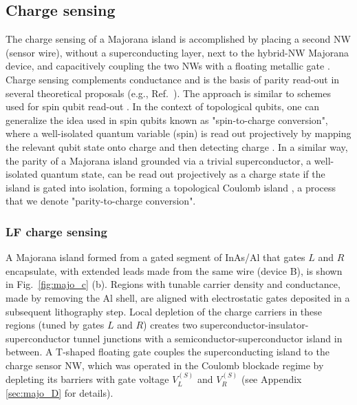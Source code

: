 \subsection{Charge sensing}
The charge sensing of a Majorana island is accomplished by placing a second NW (sensor wire), without a superconducting layer, next to the hybrid-NW Majorana device, and capacitively coupling the two NWs with a floating metallic gate \cite{charge_sensing1}. Charge sensing complements conductance and is the basis of parity read-out in several theoretical proposals (e.g., Ref.~\cite{AasenPRX16}). The approach is similar to schemes used for spin qubit read-out \cite{floatinggate,PhysRevApplied.4.014018,charge_sensing2}. In the context of topological qubits, one can generalize the idea used in spin qubits known as "spin-to-charge conversion", where a well-isolated quantum variable (spin) is read out projectively by mapping the relevant qubit state onto charge and then detecting charge \cite{petta,RevModPhys.79.1217}. In a similar way, the parity of a Majorana island grounded via a trivial superconductor, a well-isolated quantum state, can be read out projectively as a charge state if the island is gated into isolation, forming a topological Coulomb island \cite{AasenPRX16}, a process that we denote "parity-to-charge conversion".

\subsubsection{LF charge sensing}
A Majorana island formed from a gated segment of InAs/Al that gates $L$ and $R$ encapsulate, with extended leads made from the same wire (device B), is shown in Fig.~\ref{fig:majo_c} (b). Regions with tunable carrier density and conductance, made by removing the Al shell, are aligned with electrostatic gates deposited in a subsequent lithography step. Local depletion of the charge carriers in these regions (tuned by gates $L$ and $R$) creates two superconductor-insulator-superconductor tunnel junctions with a semiconductor-superconductor island in between. A T-shaped floating gate couples the superconducting island to the charge sensor NW, which was operated in the Coulomb blockade regime by depleting its barriers with gate voltage $V_{L}^{(S)}$ and $V_{R}^{(S)}$ (see Appendix \ref{sec:majo_D} for details).

